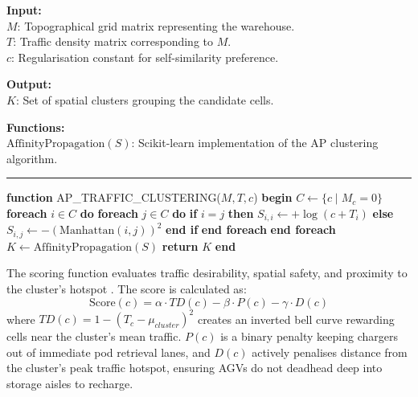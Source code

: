 \documentclass[conference]{IEEEtran}
\newcommand{\alginput}[1]{\vspace{0.2cm}\noindent\textbf{Input:}\\ \indent #1}
\newcommand{\algoutput}[1]{\vspace{0.2cm}\noindent\textbf{Output:}\\ \indent #1}
\newcommand{\algfunc}[1]{\vspace{0.2cm}\noindent\textbf{Functions:}\\ \indent #1}
\begin{document}
\begin{algorithm}[htbp]
\caption{AP\_TRAFFIC\_CLUSTERING: Traffic Density Clustering}
\label{alg:ap_cluster}
\alginput{
$M$: Topographical grid matrix representing the warehouse.\\
$T$: Traffic density matrix corresponding to $M$.\\
$c$: Regularisation constant for self-similarity preference.
}
\algoutput{
$K$: Set of spatial clusters grouping the candidate cells.
}
\algfunc{
$\text{AffinityPropagation}(S)$: Scikit-learn implementation of the AP clustering algorithm.
}
\vspace{0.2cm}
\hrule
\vspace{0.2cm}
\begin{algorithmic}[1]
\STATE \textbf{function} AP\_TRAFFIC\_CLUSTERING($M, T, c$)
\STATE \textbf{begin}
\STATE \quad $C \leftarrow \{ c \mid M_c = 0 \}$
\STATE \quad \textbf{foreach} $i \in C$ \textbf{do}
\STATE \quad \quad \textbf{foreach} $j \in C$ \textbf{do}
\STATE \quad \quad \quad \textbf{if} $i = j$ \textbf{then}
\STATE \quad \quad \quad \quad $S_{i,i} \leftarrow +\log(c + T_i)$
\STATE \quad \quad \quad \textbf{else}
\STATE \quad \quad \quad \quad $S_{i,j} \leftarrow -(\text{Manhattan}(i, j))^2$
\STATE \quad \quad \quad \textbf{end if}
\STATE \quad \quad \textbf{end foreach}
\STATE \quad \textbf{end foreach}
\STATE \quad $K \leftarrow \text{AffinityPropagation}(S)$
\STATE \quad \textbf{return} $K$
\STATE \textbf{end}
\end{algorithmic}
\end{algorithm}

The scoring function evaluates traffic desirability, spatial safety, and proximity to the cluster's hotspot \cite{baras2023}. The score is calculated as:
\begin{equation}
\label{eq:p2_score}
    \text{Score}(c) = \alpha \cdot TD(c) - \beta \cdot P(c) - \gamma \cdot D(c)
\end{equation}
where $TD(c) = 1 - (T_c - \mu_{cluster})^2$ creates an inverted bell curve rewarding cells near the cluster's mean traffic. $P(c)$ is a binary penalty keeping chargers out of immediate pod retrieval lanes, and $D(c)$ actively penalises distance from the cluster's peak traffic hotspot, ensuring AGVs do not deadhead deep into storage aisles to recharge.
\end{document}
